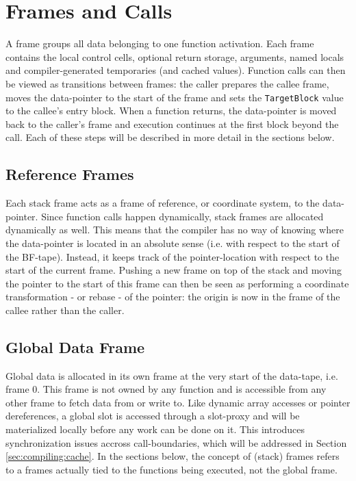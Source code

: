 \section{Frames and Calls}
A frame groups all data belonging to one function activation. Each frame contains the local control cells, optional return storage, arguments, named locals and compiler-generated temporaries (and cached values). Function calls can then be viewed as transitions between frames: the caller prepares the callee frame, moves the data-pointer to the start of the frame and sets the \texttt{TargetBlock} value to the callee's entry block. When a function returns, the data-pointer is moved back to the caller's frame and execution continues at the first block beyond the call. Each of these steps will be described in more detail in the sections below.

\subsection{Reference Frames}
Each stack frame acts as a frame of reference, or coordinate system, to the data-pointer. Since function calls happen dynamically, stack frames are allocated dynamically as well. This means that the compiler has no way of knowing where the data-pointer is located in an absolute sense (i.e. with respect to the start of the BF-tape). Instead, it keeps track of the pointer-location with respect to the start of the current frame. Pushing a new frame on top of the stack and moving the pointer to the start of this frame can then be seen as performing a coordinate transformation - or rebase - of the pointer: the origin is now in the frame of the callee rather than the caller. 

\subsection{Global Data Frame}
Global data is allocated in its own frame at the very start of the data-tape, i.e. frame 0. This frame is not owned by any function and is accessible from any other frame to fetch data from or write to. Like dynamic array accesses or pointer dereferences, a global slot is accessed through a slot-proxy and will be materialized locally before any work can be done on it. This introduces synchronization issues accross call-boundaries, which will be addressed in Section \ref{sec:compiling:cache}. In the sections below, the concept of (stack) frames refers to a frames actually tied to the functions being executed, not the global frame.

